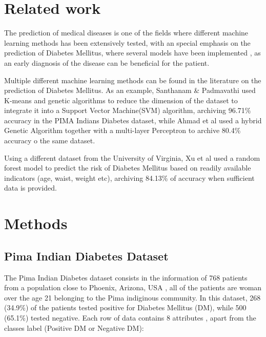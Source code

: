 \documentclass[10pt,twocolumn,letterpaper]{article}
\begin{document}

\section{Related work}


The prediction of medical diseases is one of the fields where different machine learning methods has been extensively tested, with an special emphasis on the prediction of Diabetes Mellitus, where several models have been implemented \cite{Xu2017,Ahmad2013,Santhanam2015,Wu2018}, as an early diagnosis of the disease can be beneficial for the patient.

Multiple different machine learning methods can be found in the literature on the prediction of Diabetes Mellitus. As an example, Santhanam \& Padmavathi \cite{Santhanam2015} used K-means and genetic algorithms to reduce the dimension of the dataset to integrate it into a Support Vector Machine(SVM) algorithm, archiving 96.71\% accuracy in the PIMA Indians Diabetes dataset, while Ahmad et al \cite{Ahmad2013} used a hybrid Genetic Algorithm together with a multi-layer Perceptron to archive 80.4\% accuracy o the same dataset.

Using a different dataset from the University of Virginia, Xu et al \cite{Xu2017} used a random forest model to predict the risk of Diabetes Mellitus based on readily available indicators (age, waist, weight etc), archiving 84.13\% of accuracy when sufficient data is provided.


\section{Methods}

\subsection{Pima Indian Diabetes Dataset}

The Pima Indian Diabetes dataset consists in the information of 768 patients from a population close to Phoenix, Arizona, USA \cite{Wu2018}, all of the patients are woman over the age 21 \cite{Xu2017} belonging to the Pima indiginous community. In this dataset, 268 (34.9\%) of the patients tested positive for Diabetes Mellitus (DM), while 500 (65.1\%) tested negative. Each row of data contains 8 attributes \cite{Wu2018}, apart from the classes label (Positive DM or Negative DM):
\end{document}
